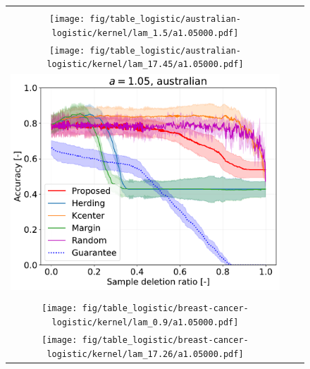 \begin{figure}[h]
	\begin{tabular}{ccc}
		\begin{minipage}[b]{0.3\hsize}\centering {\small Dataset: australian, $\lambda=\lambda_\mathrm{best}$}\\\texttt{[image: fig/table\_logistic/australian-logistic/kernel/lam\_1.5/a1.05000.pdf]}\end{minipage}
		&
		\begin{minipage}[b]{0.3\hsize}\centering {\small Dataset: australian, $\lambda=n \cdot 10^{-1.5}$}\\\texttt{[image: fig/table\_logistic/australian-logistic/kernel/lam\_17.45/a1.05000.pdf]}\end{minipage}
		&
		\begin{minipage}[b]{0.3\hsize}\centering {\small Dataset: australian, $\lambda=n$}\\\includegraphics[width=0.8\hsize]{fig/table_logistic/australian-logistic/kernel/lam_552/a1.05000.pdf}\end{minipage}
		\\
		\begin{minipage}[b]{0.3\hsize}\centering {\small Dataset: breast-cancer, $\lambda=\lambda_\mathrm{best}$}\\\texttt{[image: fig/table\_logistic/breast-cancer-logistic/kernel/lam\_0.9/a1.05000.pdf]}\end{minipage}
		&
		\begin{minipage}[b]{0.3\hsize}\centering {\small Dataset: breast-cancer, $\lambda=n \cdot 10^{-1.5}$}\\\texttt{[image: fig/table\_logistic/breast-cancer-logistic/kernel/lam\_17.26/a1.05000.pdf]}\end{minipage}

\end{tabular}
\end{figure}
